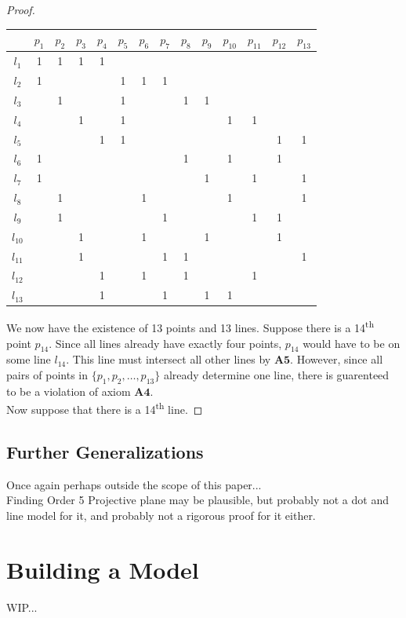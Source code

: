 \documentclass{article}
\begin{document}
\begin{proof}
\begin{center}
\begin{tabular}{ c|c|c|c|c|c|c|c|c|c|c|c|c|c }
  & $p_1$ & $p_2$ & $p_3$ &$p_4$ &$p_5$ &$p_6$ &$p_7$ &$p_8$ &$p_9$  &$p_{10}$&$p_{11}$&$p_{12}$&$p_{13}$ \\ 
\hline
 $l_1$ & 1 & 1 & 1 & 1 &  &&& &&&&& \\ 
 \hline
 $l_2$ & 1 & &&&1&1&1&&&&&& \\
 \hline
 $l_3$ & &1&&&1&&&1&1&&&&\\
 \hline
 $l_4$ &  &  & 1 &  &1 & &&&&1&1&&\\
 \hline
 $l_5$ & &&&1&1&&&&&&&1&1\\
 \hline
 $l_6$ &1&&&&&&&1&&1&&1& \\
 \hline
 $l_7$ &1&&&&&&&&1&&1&&1\\
 \hline
 $l_8$ &&1&&&&1&&&&1&&&1\\
 \hline
 $l_9$ &&1&&&&&1&&&&1&1&\\
 \hline
 $l_{10}$ &&&1&&&1&&&1&&&1&\\
 \hline
 $l_{11}$ &&&1&&&&1&1&&&&&1\\
 \hline
 $l_{12}$&&&&1&&1&&1&&&1&&\\
 \hline
 $l_{13}$ &&&&1&&&1&&1&1&&& 

\end{tabular}
\end{center}

We now have the existence of 13 points and 13 lines. Suppose there is a 14\textsuperscript{th} point $p_{14}$. Since all lines already have exactly four points, $p_{14}$ would have to be on some line $l_{14}$. This line must intersect all other lines by $\mathbf{A5}$. However, since all pairs of points in $\{p_1,p_2, \dots , p_{13}\}$ already determine one line, there is guarenteed to be a violation of axiom $\mathbf{A4}$. \\

Now suppose that there is a 14\textsuperscript{th} line. 

 \end{proof}
\subsection{Further Generalizations}

Once again perhaps outside the scope of this paper...\\

Finding Order 5 Projective plane may be plausible, but probably not a dot and line model for it, and probably not a rigorous proof for it either.

\section{Building a Model}
WIP... 
\end{document}

